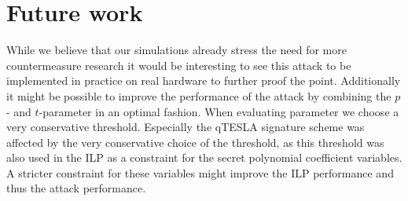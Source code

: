 \section{Future work}
While we believe that our simulations already stress the need for more countermeasure research it would be interesting to see this attack to be implemented in practice on real hardware to further proof the point.
Additionally it might be possible to improve the performance of the attack by combining the $p$- and $t$-parameter in an optimal fashion. When evaluating  parameter we choose a very conservative threshold.
Especially the qTESLA signature scheme was affected by the very conservative choice of the threshold, as this threshold was also used in the ILP as a constraint for the secret polynomial coefficient variables. A stricter constraint for these variables might improve the ILP performance and thus the attack performance.